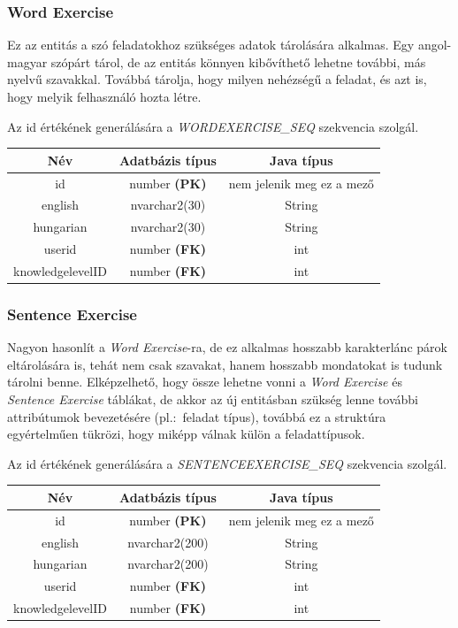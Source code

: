 \documentclass[11pt, a4paper]{article}
\begin{document}
    \subsubsection{Word Exercise}
    Ez az entitás a szó feladatokhoz szükséges adatok tárolására alkalmas. Egy angol-magyar szópárt tárol, de az entitás könnyen kibővíthető lehetne további, más nyelvű szavakkal. Továbbá tárolja, hogy milyen nehézségű a feladat, és azt is, hogy melyik felhasználó hozta létre.
    
    Az id értékének generálására a \textit{WORDEXERCISE\_SEQ} szekvencia szolgál.
    
    \begin{table}[!h]
    	\centering
    	\begin{tabular} {|c|c|c|}
    		\hline
    		Név & Adatbázis típus & Java típus \\
    		\hline
    		id & number \textbf{(PK)} & nem jelenik meg ez a mező \\
    		english & nvarchar2(30) & String \\
    		hungarian & nvarchar2(30) & String \\
    		userid & number \textbf{(FK)} & int \\
    		knowledgelevelID & number \textbf{(FK)} & int \\
    		\hline
    	\end{tabular}
    \end{table}
    
    \subsubsection{Sentence Exercise}
    Nagyon hasonlít a \textit{Word Exercise}-ra, de ez alkalmas hosszabb karakterlánc párok eltárolására is, tehát nem csak szavakat, hanem hosszabb mondatokat is tudunk tárolni benne. Elképzelhető, hogy össze lehetne vonni a \textit{Word Exercise} és \textit{Sentence Exercise} táblákat, de akkor az új entitásban szükség lenne további attribútumok bevezetésére (pl.:~feladat típus), továbbá ez a struktúra egyértelműen tükrözi, hogy miképp válnak külön a feladattípusok.
    
    Az id értékének generálására a \textit{SENTENCEEXERCISE\_SEQ} szekvencia szolgál.
    
    \begin{table}[!h]
    	\centering
    	\begin{tabular} {|c|c|c|}
    		\hline
    		Név & Adatbázis típus & Java típus \\
    		\hline
    		id & number \textbf{(PK)} & nem jelenik meg ez a mező \\
    		english & nvarchar2(200) & String \\
    		hungarian & nvarchar2(200) & String \\
    		userid & number \textbf{(FK)} & int \\
    		knowledgelevelID & number \textbf{(FK)} & int \\
    		\hline
    	\end{tabular}
    \end{table}
    
\end{document}
